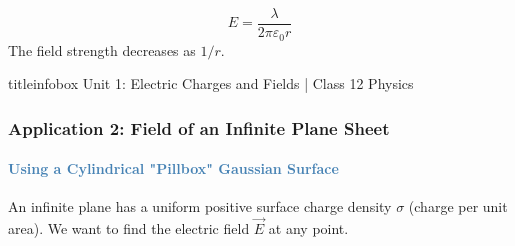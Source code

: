 \begin{frame}
\begin{frame}
\vspace{0.3cm}

\begin{formulabox}
\vspace{0.1cm}
\begin{equation*}
\boxed{E = \frac{\lambda}{2\pi\varepsilon_0 r}}
\end{equation*}
The field strength decreases as $1/r$.
\vspace{0.1cm}
\end{formulabox}

\vfill

\begin{beamercolorbox}[wd=\textwidth,ht=0.5cm,dp=0.1cm,center]{titleinfobox}
    \small\color{coolgray} Unit 1: Electric Charges and Fields | Class 12 Physics
\end{beamercolorbox}
\end{frame}

\begin{frame}
\frametitle{\textsf{\textbf{Application 2: Field of an Infinite Plane Sheet}}}
\framesubtitle{\textcolor{steelblue}{Using a Cylindrical "Pillbox" Gaussian Surface}}

\begin{keybox}
\vspace{0.1cm}
An infinite plane has a uniform positive surface charge density $\sigma$ (charge per unit area). We want to find the electric field $\vec{E}$ at any point.
\vspace{0.1cm}
\end{keybox}

\vspace{0.3cm}


\end{frame}
\end{frame}
